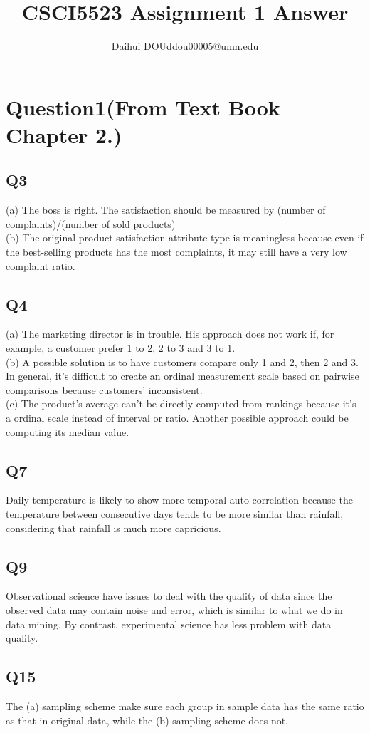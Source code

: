 \documentclass[a4paper]{article}
\title{CSCI5523 Assignment 1 Answer}
\author{Daihui DOU\qquad ddou00005@umn.edu\qquad 5514178 }
\begin{document}
\maketitle

\section{Question1(From Text Book Chapter 2.)}
\subsection{Q3}
(a) The boss is right. The satisfaction should be measured by (number of complaints)/(number of sold products)
\\(b) The original product satisfaction attribute type is meaningless because even if the best-selling products has the most complaints, it may still have a very low complaint ratio.
\subsection{Q4}
(a) The marketing director is in trouble. His approach does not work if, for example, a customer prefer 1 to 2, 2 to 3 and 3 to 1.
\\(b) A possible solution is to have customers compare only 1 and 2, then 2 and 3. In general, it's difficult to create an ordinal measurement scale based on pairwise comparisons because customers' inconsistent.
\\(c) The product's average can't be directly computed from rankings because it's a ordinal scale instead of interval or ratio. Another possible approach could be computing its median value. 
\subsection{Q7}
Daily temperature is likely to show more temporal auto-correlation because the temperature between consecutive days tends to be more similar than rainfall, considering that rainfall is much more capricious.
\subsection{Q9}
Observational science have issues to deal with the quality of data since the observed data may contain noise and error, which is similar to what we do in data mining. By contrast, experimental science has less problem with data quality.
\subsection{Q15}
The (a) sampling scheme make sure each group in sample data has the same ratio as that in original data, while the (b) sampling scheme does not.
\end{document}
